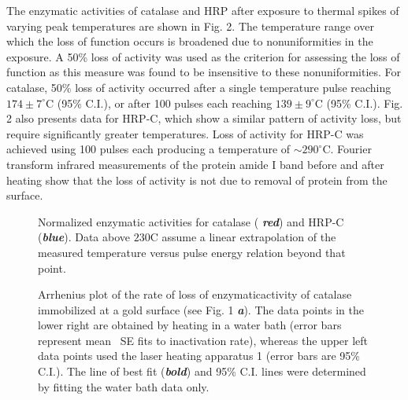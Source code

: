 \documentclass{biophys_letter}
\begin{document}
The enzymatic activities of catalase and HRP after exposure to thermal spikes of varying peak temperatures are shown in Fig. 2. The temperature range over which the loss of function occurs is broadened due to nonuniformities in the exposure. A 50\% loss of activity was used as the criterion for assessing the loss of function as this measure was found to be insensitive to these nonuniformities. For catalase, 50\% loss of activity occurred after a single temperature pulse reaching $174\pm 7^\circ$C (95\% C.I.), or after 100 pulses each reaching $139\pm 9^\circ$C (95\% C.I.). Fig. 2 also presents data for HRP-C, which show a similar pattern of activity loss, but require significantly greater temperatures. Loss of activity for HRP-C was achieved using 100 pulses each producing a temperature of ${\sim}290^\circ$C. Fourier transform infrared  measurements of the protein amide I band before and after heating show that the loss of activity is not due to removal of protein from the surface.
\begin{figure}[b!]\vspace*{-5pt}
\caption{Normalized enzymatic activities for catalase ({\bfseries\itshape
red}) and HRP-C ({\bfseries\itshape blue}). Data above $\mbox{230}$\textdegree C assume a linear extrapolation of the measured temperature versus pulse energy relation beyond that point.}
\vspace*{-1.5pt}
\end{figure}
\begin{figure}[t!]\vspace*{3pt}
\caption{Arrhenius plot of the rate of loss of enzymatic\break activity of catalase immobilized at a gold surface (see Fig. 1 {\bfseries\itshape a}). The data points in the lower right are obtained by heating in a water bath (error bars represent mean \textpm\ SE fits to inactivation rate), whereas the upper left data points used the laser heating apparatus 1 (error bars are 95\% C.I.). The line of best fit ({\bfseries\itshape bold}) and 95\% C.I. lines were determined by fitting the water bath data only.
}\vspace*{-8pt}
\end{figure}
\end{document}
